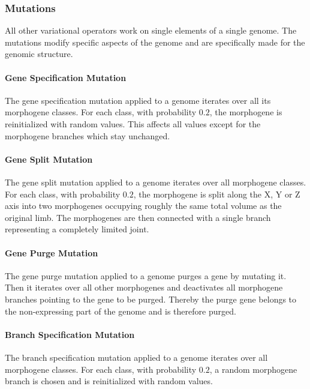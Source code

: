 \documentclass[main]{subfiles}
\begin{document}
\subsubsection{Mutations}

All other variational operators work on single elements of a single genome. %
%
The mutations modify specific aspects of the genome and are specifically made for the genomic structure.

\paragraph{Gene Specification Mutation}

The gene specification mutation applied to a genome iterates over all its morphogene classes. %
%
For each class, with probability $0.2$, the morphogene is reinitialized with random values. %
%
This affects all values except for the morphogene branches which stay unchanged.

\paragraph{Gene Split Mutation}

The gene split mutation applied to a genome iterates over all morphogene classes. %
%
For each class, with probability $0.2$, the morphogene is split along the X, Y or Z axis into two morphogenes occupying roughly the same total volume as the original limb. %
%
The morphogenes are then connected with a single branch representing a completely limited joint.

\paragraph{Gene Purge Mutation}

The gene purge mutation applied to a genome purges a gene by mutating it. %
%
Then it iterates over all other morphogenes and deactivates all morphogene branches pointing to the gene to be purged. %
%
Thereby the purge gene belongs to the non-expressing part of the genome and is therefore purged.

\paragraph{Branch Specification Mutation}

The branch specification mutation applied to a genome iterates over all morphogene classes. %
%
For each class, with probability $0.2$, a random morphogene branch is chosen and is reinitialized with random values. 
\end{document}
